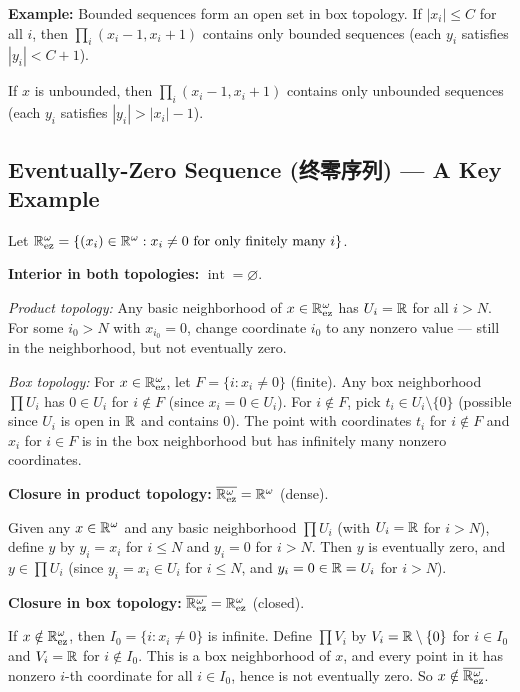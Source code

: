 \documentclass{article}
\begin{document}
\textbf{Example:} Bounded sequences form an open set in box topology.
If $|x_i| \le C$ for all $i$, then $\prod_i (x_i - 1, x_i + 1)$
contains only bounded sequences (each $y_i$ satisfies $|y_i| < C + 1$).

If $x$ is unbounded, then $\prod_i (x_i - 1, x_i + 1)$ contains only
unbounded sequences (each $y_i$ satisfies $|y_i| > |x_i| - 1$).

\subsection{Eventually-Zero Sequence (终零序列) --- A Key
Example}\label{def:eventually-zero}

Let $\mathbb{R}^\omega_{\mathrm{ez}} = \{(x_i) \in \mathbb{R}^\omega : x_i \ne 0
\text{ for only finitely many } i\}$.

\textbf{Interior in both topologies:} $\operatorname{int} = \varnothing$.

\emph{Product topology:} Any basic neighborhood of $x \in
\mathbb{R}^\omega_{\mathrm{ez}}$ has $U_i = \mathbb{R}$ for all $i > N$. For some $i_0
> N$ with $x_{i_0} = 0$, change coordinate $i_0$ to any nonzero value
--- still in the neighborhood, but not eventually zero.

\emph{Box topology:} For $x \in \mathbb{R}^\omega_{\mathrm{ez}}$, let $F =
\{i : x_i \ne 0\}$ (finite). Any box neighborhood $\prod U_i$ has
$0 \in U_i$ for $i \notin F$ (since $x_i = 0 \in U_i$). For $i
\notin F$, pick $t_i \in U_i \setminus \{0\}$ (possible since $U_i$ is
open in $\mathbb{R}$ and contains $0$). The point with coordinates $t_i$ for
$i \notin F$ and $x_i$ for $i \in F$ is in the box neighborhood but
has infinitely many nonzero coordinates.

\textbf{Closure in product topology:} $\overline{\mathbb{R}^\omega_{\mathrm{ez}}}
= \mathbb{R}^\omega$ (dense).

Given any $x \in \mathbb{R}^\omega$ and any basic neighborhood $\prod U_i$
(with $U_i = \mathbb{R}$ for $i > N$), define $y$ by $y_i = x_i$ for $i \le N$
and $y_i = 0$ for $i > N$. Then $y$ is eventually zero, and $y \in
\prod U_i$ (since $y_i = x_i \in U_i$ for $i \le N$, and $y_i = 0 \in
\mathbb{R} = U_i$ for $i > N$).

\textbf{Closure in box topology:}
$\overline{\mathbb{R}^\omega_{\mathrm{ez}}} =
\mathbb{R}^\omega_{\mathrm{ez}}$ (closed).

If $x \notin \mathbb{R}^\omega_{\mathrm{ez}}$, then $I_0 = \{i : x_i \ne 0\}$
is infinite. Define $\prod V_i$ by $V_i = \mathbb{R} \setminus \{0\}$ for $i
\in I_0$ and $V_i = \mathbb{R}$ for $i \notin I_0$. This is a box neighborhood
of $x$, and every point in it has nonzero $i$-th coordinate for all $i
\in I_0$, hence is not eventually zero. So $x \notin
\overline{\mathbb{R}^\omega_{\mathrm{ez}}}$.
\end{document}
